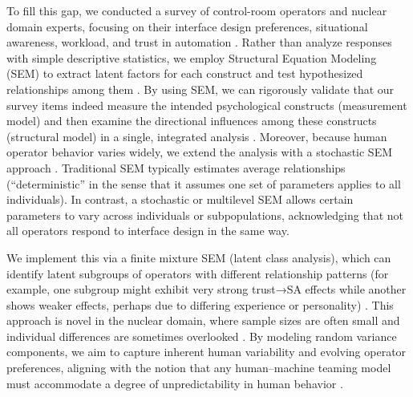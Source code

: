 \documentclass[conference]{IEEEtran}
\begin{document}
To fill this gap, we conducted a survey of control-room operators and nuclear domain experts, focusing on their interface design preferences, situational awareness, workload, and trust in automation \cite{nrc2016human, sciencedirect2025structural, nuclear2024analysis, oecd2016technical, iapsam2022human, revistanuclear2020licenciamiento, mdpi2025small, nrc2015smr}. Rather than analyze responses with simple descriptive statistics, we employ Structural Equation Modeling (SEM) to extract latent factors for each construct and test hypothesized relationships among them \cite{guilford2016principles, sciencedirect2021human, pmc2010neurophysiological, reliability2017structural, researchgate2002structural}. By using SEM, we can rigorously validate that our survey items indeed measure the intended psychological constructs (measurement model) and then examine the directional influences among these constructs (structural model) in a single, integrated analysis \cite{taylor1999cutoff, sciencedirect2025structural, pmc2010neurophysiological, frontiers2022closed, reliability2017structural}. Moreover, because human operator behavior varies widely, we extend the analysis with a stochastic SEM approach \cite{springer2002beyond, pmc2021influence, taylor2023structural, springer2025stochastic, researchgate2010optimal, mdpi2020functional}. Traditional SEM typically estimates average relationships (“deterministic” in the sense that it assumes one set of parameters applies to all individuals). In contrast, a stochastic or multilevel SEM allows certain parameters to vary across individuals or subpopulations, acknowledging that not all operators respond to interface design in the same way.

We implement this via a finite mixture SEM (latent class analysis), which can identify latent subgroups of operators with different relationship patterns (for example, one subgroup might exhibit very strong trust→SA effects while another shows weaker effects, perhaps due to differing experience or personality) \cite{springer2002beyond, pmc2021influence, taylor2023structural, springer2025stochastic, researchgate2010optimal, mdpi2020functional, mdpi2023uav, nature2025situational, harvard2025paper}. This approach is novel in the nuclear domain, where sample sizes are often small and individual differences are sometimes overlooked \cite{nuclear2024analysis, taylor2023structural, frontiers2022closed, reliability2017structural, researchgate2002structural, mdpi2023mathematical}. By modeling random variance components, we aim to capture inherent human variability and evolving operator preferences, aligning with the notion that any human–machine teaming model must accommodate a degree of unpredictability in human behavior \cite{sciencedirect2015situation, sciencedirect2015measuring, pubmed2024effects, sage1995toward, researchgate2010optimal, mdpi2020functional, reddit2025solving, pmc2023effects, mdpi2023algorithms, openreview2025review}.
\end{document}
